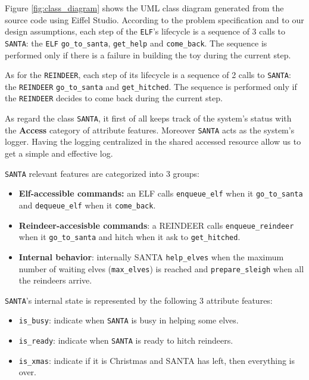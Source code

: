 Figure \ref{fig:class_diagram} shows the UML class diagram generated from the source code using Eiffel Studio. 
According to the problem specification and to our design assumptions, each step of the \texttt{ELF}'s lifecycle is a sequence of 3 calls to \texttt{SANTA}: the \texttt{ELF} \texttt{go\_to\_santa}, \texttt{get\_help} and \texttt{come\_back}. The sequence is performed only if there is a failure in building the toy during the current step.

As for the \texttt{REINDEER}, each step of its lifecycle is a sequence of 2 calls to \texttt{SANTA}: the \texttt{REINDEER} \texttt{go\_to\_santa} and \texttt{get\_hitched}. The sequence is performed only if the \texttt{REINDEER} decides to come back during the current step.

As regard the class \texttt{SANTA}, it first of all keeps track of the system's status with the \textbf{Access} category of attribute features.
Moreover \texttt{SANTA} acts as the system's logger. Having the logging centralized in the shared accessed resource allow us to get a simple and effective log.

\texttt{SANTA} relevant features are categorized into 3 groups:

\begin{itemize}
	\item \textbf{Elf-accessible commands:} an ELF calls \texttt{enqueue\_elf} when it \texttt{go\_to\_santa} and \texttt{dequeue\_elf} when it \texttt{come\_back}. 
	\item \textbf{Reindeer-accesisble commands}: a REINDEER calls \texttt{enqueue\_reindeer} when it \texttt{go\_to\_santa} and hitch when it ask to \texttt{get\_hitched}.
	\item \textbf{Internal behavior}: internally SANTA \texttt{help\_elves} when the maximum number of waiting elves (\texttt{max\_elves}) is reached and \texttt{prepare\_sleigh} when all the reindeers arrive.
\end{itemize}

\texttt{SANTA}'s internal state is represented by the following 3 attribute features:

\begin{itemize}
	\item \texttt{is\_busy}: indicate when \texttt{SANTA} is busy in helping some elves.
	\item \texttt{is\_ready}: indicate when \texttt{SANTA} is ready to hitch reindeers.
	\item \texttt{is\_xmas}: indicate if it is Christmas and SANTA has left, then everything is over.
\end{itemize}

